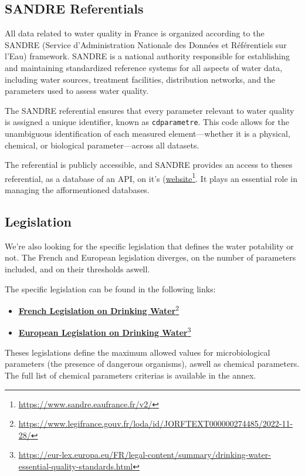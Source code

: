 \documentclass{article}
\begin{document}
\newpage
\subsection{SANDRE Referentials}
All data related to water quality in France is organized according to the SANDRE (Service d’Administration Nationale des Données et Référentiels sur l’Eau) framework. SANDRE is a national authority responsible for establishing and maintaining standardized reference systems for all aspects of water data, including water sources, treatment facilities, distribution networks, and the parameters used to assess water quality.

The SANDRE referential ensures that every parameter relevant to water quality is assigned a unique identifier, known as \texttt{cdparametre}. This code allows for the unambiguous identification of each measured element—whether it is a physical, chemical, or biological parameter—across all datasets.

The referential is publicly accessible, and SANDRE provides an access to theses referential, as a database of an API, on it's (\href{https://www.sandre.eaufrance.fr/v2/}{website}\footnote{\url{https://www.sandre.eaufrance.fr/v2/}}. It plays an essential role in managing the afformentioned databases.

\subsection{Legislation}
We're also looking for the specific legislation that defines the water potability or not.
The French and European legislation diverges, on the number of parameters included, and on their thresholds aswell.

The specific legislation can be found in the following links:
\begin{itemize}
    \item \href{https://www.legifrance.gouv.fr/loda/id/JORFTEXT000000274485/2022-11-28/}{\textbf{French Legislation on Drinking Water}}\footnote{\url{https://www.legifrance.gouv.fr/loda/id/JORFTEXT000000274485/2022-11-28/}}
    \item \href{https://eur-lex.europa.eu/FR/legal-content/summary/drinking-water-essential-quality-standards.html}{\textbf{European Legislation on Drinking Water}}\footnote{\url{https://eur-lex.europa.eu/FR/legal-content/summary/drinking-water-essential-quality-standards.html}}
\end{itemize}

Theses legislations define the maximum allowed values for microbiological parameters (the presence of dangerous organisms), aswell as chemical parameters.
The full list of chemical parameters criterias is available in the annex.
\end{document}

